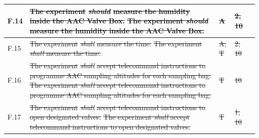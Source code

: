 \documentclass[a4paper,12pt,twoside]{article}
\providecommand{\DIFaddtex}[1]{{\protect\color{blue}\uwave{#1}}} %
\providecommand{\DIFdeltex}[1]{{\protect\color{red}\sout{#1}}}                      %
\providecommand{\DIFaddbegin}{} %
\providecommand{\DIFaddend}{} %
\providecommand{\DIFdelbegin}{} %
\providecommand{\DIFdelend}{} %
\providecommand{\DIFadd}[1]{\texorpdfstring{\DIFaddtex{#1}}{#1}} %
\providecommand{\DIFdel}[1]{\texorpdfstring{\DIFdeltex{#1}}{}} %
\newcommand{\DIFscaledelfig}{0.5}
\newlength{\DIFdelgraphicswidth} %
\newlength{\DIFdelgraphicsheight} %
\newcommand{\DIFaddincludegraphics}[2][]{{\color{blue}\fbox{\DIFOincludegraphics[#1]{#2}}}} %
\newcommand{\DIFdelincludegraphics}[2][]{%
\sbox{\DIFdelgraphicsbox}{\DIFOincludegraphics[#1]{#2}}%
\settoboxwidth{\DIFdelgraphicswidth}{\DIFdelgraphicsbox} %
\settoboxtotalheight{\DIFdelgraphicsheight}{\DIFdelgraphicsbox} %
\scalebox{\DIFscaledelfig}{%
\parbox[b]{\DIFdelgraphicswidth}{\usebox{\DIFdelgraphicsbox}\\[-\baselineskip] \rule{\DIFdelgraphicswidth}{0em}}\llap{\resizebox{\DIFdelgraphicswidth}{\DIFdelgraphicsheight}{%
\setlength{\unitlength}{\DIFdelgraphicswidth}%
\begin{picture}(1,1)%
\thicklines\linethickness{2pt} %
{\color[rgb]{1,0,0}\put(0,0){\framebox(1,1){}}}%
{\color[rgb]{1,0,0}\put(0,0){\line( 1,1){1}}}%
{\color[rgb]{1,0,0}\put(0,1){\line(1,-1){1}}}%
\end{picture}%
}\hspace*{3pt}}} %
} %
\DeclareRobustCommand{\DIFaddbegin}{\DIFOaddbegin \let\includegraphics\DIFaddincludegraphics} %
\DeclareRobustCommand{\DIFaddend}{\DIFOaddend \let\includegraphics\DIFOincludegraphics} %
\DeclareRobustCommand{\DIFdelbegin}{\DIFOdelbegin \let\includegraphics\DIFdelincludegraphics} %
\DeclareRobustCommand{\DIFdelend}{\DIFOaddend \let\includegraphics\DIFOincludegraphics} %
\begin{document}
\begin{longtable}[]{|m{}| m{} |m{} |m{}|m{}|}
F.14 & \DIFdelbegin \DIFdel{The experiment }\textit{\DIFdel{should}} %
\DIFdel{measure the humidity inside the AAC Valve Box.                                                                                                    }\DIFdelend \DIFaddbegin \st{The experiment \textit{should} measure the humidity inside the AAC Valve Box.}\DIFadd{\textsuperscript{\ref{fn:unnecessary-requirement}}                                                                                                     }\DIFaddend &      \DIFdelbegin \DIFdel{A        }\DIFdelend \DIFaddbegin \DIFadd{-        }\DIFaddend & \DIFdelbegin \DIFdel{2, 10            }\DIFdelend \DIFaddbegin \DIFadd{-            }\DIFaddend &        \\ \hline
F.15 & \DIFdelbegin \DIFdel{The experiment }\textit{\DIFdel{shall}} %
\DIFdel{measure the time.                                                                                                                                  }\DIFdelend \DIFaddbegin \st{The experiment \textit{shall} measure the time.} \DIFadd{\textsuperscript{\ref{fn:unverifiable-requirement}}                                                                                                                                  }\DIFaddend &        \DIFdelbegin \DIFdel{A, T      }\DIFdelend \DIFaddbegin \DIFadd{-     }\DIFaddend & \DIFdelbegin \DIFdel{2, 10            }\DIFdelend \DIFaddbegin \DIFadd{-            }\DIFaddend &        \\ \hline
F.16 & \DIFdelbegin \DIFdel{The experiment }\textit{\DIFdel{shall}} %
\DIFdel{accept telecommand instructions to programme AAC sampling altitudes for each sampling bag.                                                         }\DIFdelend \DIFaddbegin \st{The experiment \textit{shall} accept telecommand instructions to programme AAC sampling altitudes for each sampling bag.}\DIFadd{\textsuperscript{\ref{fn:unnecessary-requirement}}                                                          }\DIFaddend &      \DIFdelbegin \DIFdel{T        }\DIFdelend \DIFaddbegin \DIFadd{-        }\DIFaddend & \DIFdelbegin \DIFdel{10            }\DIFdelend \DIFaddbegin \DIFadd{-           }\DIFaddend &        \\ \hline
F.17 & \DIFdelbegin \DIFdel{The experiment }\textit{\DIFdel{shall}} %
\DIFdel{accept telecommand instructions to open designated valves.                                                                                         }\DIFdelend \DIFaddbegin \st{The experiment \textit{shall} accept telecommand instructions to open designated valves.}\DIFadd{\textsuperscript{\ref{fn:unnecessary-requirement}}                                                                                          }\DIFaddend &      \DIFdelbegin \DIFdel{T        }\DIFdelend \DIFaddbegin \DIFadd{-      }\DIFaddend & \DIFdelbegin \DIFdel{1, 10            }\DIFdelend \DIFaddbegin \DIFadd{-        }\DIFaddend &        \\ \hline

\end{longtable}
\end{document}

